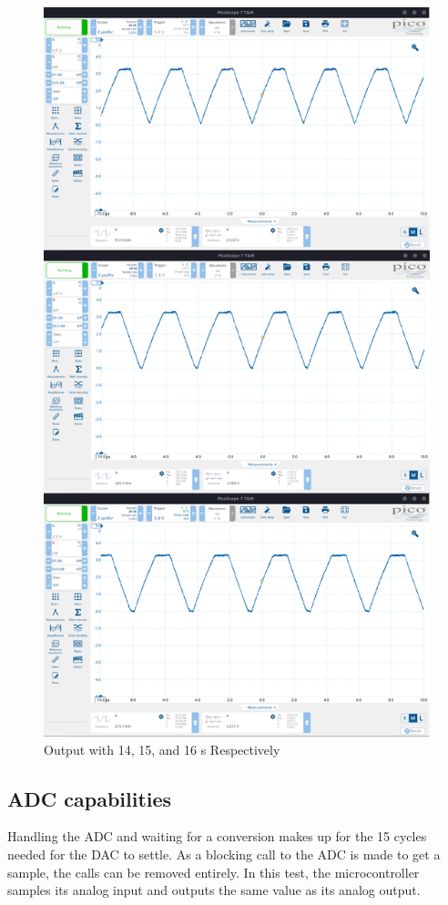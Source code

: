\begin{figure}[H]
    \centering
    \includegraphics[width=120mm, keepaspectratio]{figures/comp.png}
    \caption{Output with 14, 15, and 16 s Respectively}
    \label{fig:comp}
\end{figure}

\subsection{ADC capabilities}

Handling the ADC and waiting for a conversion makes up for the 15 cycles needed for the DAC to settle. As a blocking call to the ADC is made to get a sample, the  calls can be removed entirely. In this test, the microcontroller samples its analog input and outputs the same value as its analog output.

